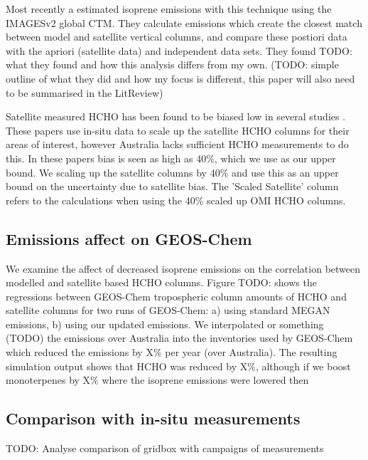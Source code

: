     Most recently a \textcite{Bauwens2016} estimated isoprene emissions with this technique using the IMAGESv2 global CTM.
    They calculate emissions which create the closest match between model and satellite vertical columns, and compare these postiori data with the apriori (satellite data) and independent data sets.
    They found TODO: what they found and how this analysis differs from my own.
    (TODO: simple outline of what they did and how my focus is different, this paper will also need to be summarised in the LitReview)
    
    Satellite measured HCHO has been found to be biased low in several studies \textcite[eg.][]{Zhu2016,DeSmedt2015,Barkley2013}.
    These papers use in-situ data to scale up the satellite HCHO columns for their areas of interest, however Australia lacks sufficient HCHO measurements to do this.
    In these papers bias is seen as high as 40\%, which we use as our upper bound.
    We scaling up the satellite columns by 40\% and use this as an upper bound on the uncertainty due to satellite bias.
    The 'Scaled Satellite' column refers to the calculations when using the 40\% scaled up OMI HCHO columns. %
    
    
  \subsection{Emissions affect on GEOS-Chem}
    
    
    We examine the affect of decreased isoprene emissions on the correlation between modelled and satellite based HCHO columns.
    Figure TODO: shows the regressions between GEOS-Chem tropospheric column amounts of HCHO and satellite columns for two runs of GEOS-Chem: a) using standard MEGAN emissions, b) using our updated emissions.
    We interpolated or something (TODO) the emissions over Australia into the inventories used by GEOS-Chem which reduced the emissions by X\% per year (over Australia).
    The resulting simulation output shows that HCHO was reduced by X\%, although if we boost monoterpenes by X\% where the isoprene emissions were lowered then 
  
  \subsection{Comparison with in-situ measurements}
    
    TODO: %
    Analyse comparison of gridbox with campaigns of measurements
    
